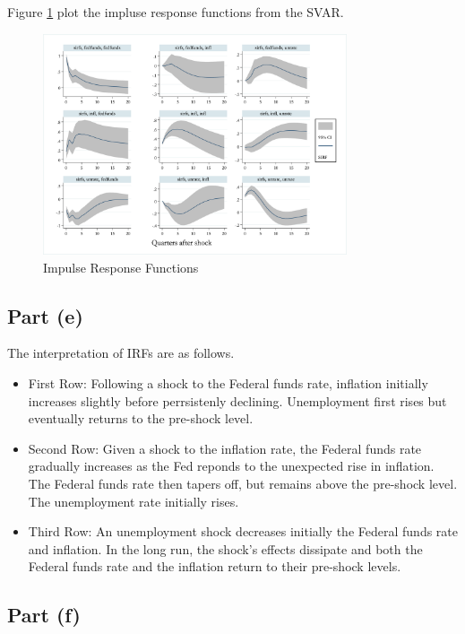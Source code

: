 \documentclass[12pt]{article}
\begin{document}
Figure \ref{fig:svar_irf} plot the impluse response functions from the SVAR.

\begin{figure}[ht]
    \centering
    \includegraphics[width=0.8\textwidth]{figs/svar_irf.png}
    \caption{Impulse Response Functions}
    \label{fig:svar_irf}
\end{figure}

\subsection*{Part (e)} 

The interpretation of IRFs are as follows.

\begin{itemize}
    \item First Row: Following a shock to the Federal funds rate, inflation initially increases slightly before perrsistenly declining. 
    Unemployment first rises but eventually returns to the pre-shock level.

    \item Second Row: Given a shock to the inflation rate, the Federal funds rate gradually increases as the Fed reponds to the unexpected rise in inflation. 
    The Federal funds rate then tapers off, but remains above the pre-shock level. 
    The unemployment rate initially rises. 

    \item Third Row: An unemployment shock decreases initially the Federal funds rate and inflation. 
    In the long run, the shock's effects dissipate and both the Federal funds rate and the inflation return to their pre-shock levels.
\end{itemize}

\subsection*{Part (f)} 
\end{document}
